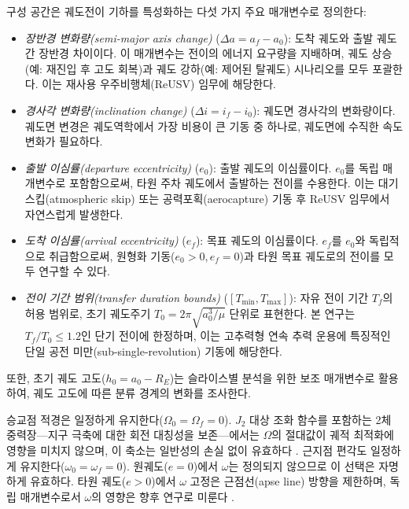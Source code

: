 \documentclass[a4paper,fleqn]{cas-dc}
\begin{document}
구성 공간은 궤도전이 기하를 특성화하는 다섯 가지 주요 매개변수로 정의한다:

\begin{itemize}
\item \textit{장반경 변화량(semi-major axis change)} ($\Delta a = a_f - a_0$): 도착 궤도와 출발 궤도 간 장반경 차이이다. 이 매개변수는 전이의 에너지 요구량을 지배하며, 궤도 상승(예: 재진입 후 고도 회복)과 궤도 강하(예: 제어된 탈궤도) 시나리오를 모두 포괄한다. 이는 재사용 우주비행체(ReUSV) 임무에 해당한다.

\item \textit{경사각 변화량(inclination change)} ($\Delta i = i_f - i_0$): 궤도면 경사각의 변화량이다. 궤도면 변경은 궤도역학에서 가장 비용이 큰 기동 중 하나로, 궤도면에 수직한 속도 변화가 필요하다.

\item \textit{출발 이심률(departure eccentricity)} ($e_0$): 출발 궤도의 이심률이다. $e_0$를 독립 매개변수로 포함함으로써, 타원 주차 궤도에서 출발하는 전이를 수용한다. 이는 대기 스킵(atmospheric skip) 또는 공력포획(aerocapture) 기동 후 ReUSV 임무에서 자연스럽게 발생한다.

\item \textit{도착 이심률(arrival eccentricity)} ($e_f$): 목표 궤도의 이심률이다. $e_f$를 $e_0$와 독립적으로 취급함으로써, 원형화 기동($e_0 > 0, e_f = 0$)과 타원 목표 궤도로의 전이를 모두 연구할 수 있다.

\item \textit{전이 기간 범위(transfer duration bounds)} ($[T_{\min}, T_{\max}]$): 자유 전이 기간 $T_f$의 허용 범위로, 초기 궤도주기 $T_0 = 2\pi\sqrt{a_0^3/\mu}$ 단위로 표현한다. 본 연구는 $T_f/T_0 \leq 1.2$인 단기 전이에 한정하며, 이는 고추력형 연속 추력 운용에 특징적인 단일 공전 미만(sub-single-revolution) 기동에 해당한다.
\end{itemize}

또한, 초기 궤도 고도($h_0 = a_0 - R_E$)는 슬라이스별 분석을 위한 보조 매개변수로 활용하여, 궤도 고도에 따른 분류 경계의 변화를 조사한다.

승교점 적경은 일정하게 유지한다($\Omega_0 = \Omega_f = 0$). $J_2$ 대상 조화 함수를 포함하는 2체 중력장---지구 극축에 대한 회전 대칭성을 보존---에서는 $\Omega$의 절대값이 궤적 최적화에 영향을 미치지 않으며, 이 축소는 일반성의 손실 없이 유효하다 \citep{Vallado2013}. 근지점 편각도 일정하게 유지한다($\omega_0 = \omega_f = 0$). 원궤도($e = 0$)에서 $\omega$는 정의되지 않으므로 이 선택은 자명하게 유효하다. 타원 궤도($e > 0$)에서 $\omega$ 고정은 근점선(apse line) 방향을 제한하며, 독립 매개변수로서 $\omega$의 영향은 향후 연구로 미룬다 \citep{Curtis2020}.
\end{document}
